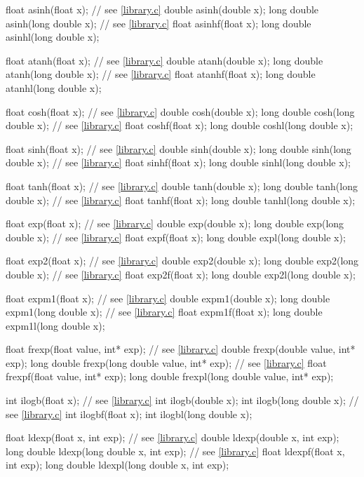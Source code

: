 \begin{codeblock}
{  float asinh(float x);                 // see \ref{library.c}
  double asinh(double x);
  long double asinh(long double x);     // see \ref{library.c}
  float asinhf(float x);
  long double asinhl(long double x);

  float atanh(float x);                 // see \ref{library.c}
  double atanh(double x);
  long double atanh(long double x);     // see \ref{library.c}
  float atanhf(float x);
  long double atanhl(long double x);

  float cosh(float x);                  // see \ref{library.c}
  double cosh(double x);
  long double cosh(long double x);      // see \ref{library.c}
  float coshf(float x);
  long double coshl(long double x);

  float sinh(float x);                  // see \ref{library.c}
  double sinh(double x);
  long double sinh(long double x);      // see \ref{library.c}
  float sinhf(float x);
  long double sinhl(long double x);

  float tanh(float x);                  // see \ref{library.c}
  double tanh(double x);
  long double tanh(long double x);      // see \ref{library.c}
  float tanhf(float x);
  long double tanhl(long double x);

  float exp(float x);                   // see \ref{library.c}
  double exp(double x);
  long double exp(long double x);       // see \ref{library.c}
  float expf(float x);
  long double expl(long double x);

  float exp2(float x);                  // see \ref{library.c}
  double exp2(double x);
  long double exp2(long double x);      // see \ref{library.c}
  float exp2f(float x);
  long double exp2l(long double x);

  float expm1(float x);                 // see \ref{library.c}
  double expm1(double x);
  long double expm1(long double x);     // see \ref{library.c}
  float expm1f(float x);
  long double expm1l(long double x);

  float frexp(float value, int* exp);   // see \ref{library.c}
  double frexp(double value, int* exp);
  long double frexp(long double value, int* exp);   // see \ref{library.c}
  float frexpf(float value, int* exp);
  long double frexpl(long double value, int* exp);

  int ilogb(float x);                   // see \ref{library.c}
  int ilogb(double x);
  int ilogb(long double x);             // see \ref{library.c}
  int ilogbf(float x);
  int ilogbl(long double x);

  float ldexp(float x, int exp);        // see \ref{library.c}
  double ldexp(double x, int exp);
  long double ldexp(long double x, int exp);    // see \ref{library.c}
  float ldexpf(float x, int exp);
  long double ldexpl(long double x, int exp);

}
\end{codeblock}
